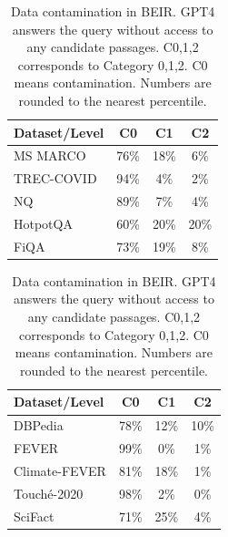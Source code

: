 \documentclass[11pt]{article}
\begin{document}
\begin{table}[ht]
\centering
\begin{minipage}{0.23\textwidth}
\centering
\scriptsize
\setlength{\tabcolsep}{3.5pt}
\begin{tabular}{l ccc}
\toprule
\textbf{Dataset/Level} & \textbf{C0} & \textbf{C1} & \textbf{C2} \\
\midrule


MS MARCO & 76\% & 18\% & 6\% \\
TREC-COVID & 94\% & 4\% & 2\% \\
NQ & 89\% & 7\% & 4\% \\
HotpotQA & 60\% & 20\% & 20\% \\
FiQA & 73\% & 19\% & 8\% \\
\bottomrule
\end{tabular}
\end{minipage}%
\hfill
\begin{minipage}{0.23\textwidth}
\centering
\scriptsize
\setlength{\tabcolsep}{3.5pt}
\begin{tabular}{l ccc}
\toprule
\textbf{Dataset/Level} & \textbf{C0} & \textbf{C1} & \textbf{C2} \\
\midrule

DBPedia & 78\% & 12\% & 10\% \\
FEVER & 99\% & 0\% & 1\% \\
Climate-FEVER & 81\% & 18\% & 1\% \\
Touché-2020 & 98\% & 2\% & 0\% \\
SciFact & 71\% & 25\% & 4\% \\
\bottomrule
\end{tabular}
\end{minipage}
\caption{Data contamination in BEIR. GPT4 answers the query without access to any candidate passages. C0,1,2 corresponds to Category 0,1,2. C0 means contamination. Numbers are rounded to the nearest percentile.}
\label{tab: beir-contamination}
\end{table}
\end{document}
